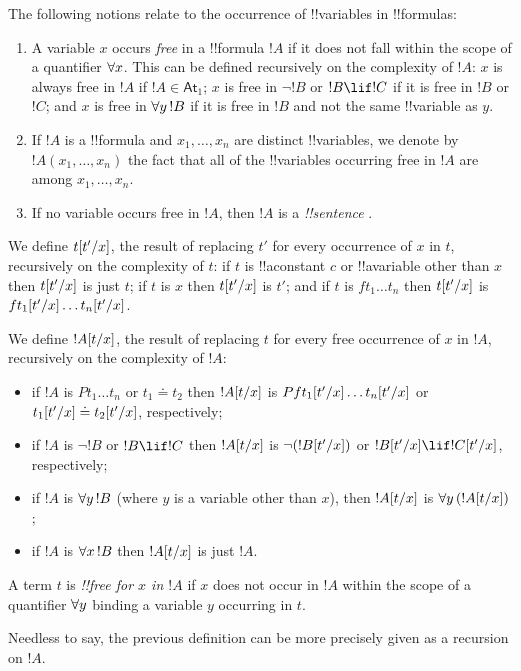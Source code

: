 \documentclass[../../include/open-logic-section]{subfiles}
\begin{document}
\begin{defn}
The following notions relate to the occurrence of
  !!{variable}s in !!{formula}s:
  \begin{enumerate}
  \item A variable $x$ occurs \emph{free} in a !!{formula} $!A$ if it
    does not fall within the scope of a quantifier $\lforall[x]$. This
    can be defined recursively on the complexity of $!A$: $x$ is
    always free in $!A$ if $!A \in \mathsf{At}_1$; $x$ is
    free in $\lnot !B$ or $!B \lif !C$ if it is free in
    $!B$ or $!C$; and $x$ is free in $\lforall[y][!B]$ if it is
    free in $!B$ and not the same !!{variable} as $y$.
  \item If $!A$ is a !!{formula} and $x_1,\ldots,x_n$ are distinct
    !!{variable}s, we denote by $!A(x_1,\ldots,x_n)$ the fact that
    all of the !!{variable}s occurring free in $!A$ are among
    $x_1,\ldots,x_n$.
  \item If no variable occurs free in $!A$, then $!A$ is a
    \emph{!!{sentence}} . 
  \end{enumerate}
\end{defn}

\begin{defn}[Substitution I]
  We define $t[t'/x]$, the result of replacing $t'$ for
  every  occurrence of $x$ in $t$, recursively on the complexity of
  $t$: if $t$ is !!a{constant} $c$ or !!a{variable} other than $x$ then
  $t[t'/x]$ is just $t$; if $t$ is $x$ then $t[t'/x]$
  is $t'$; and if $t$ is $ft_1\ldots t_n$ then $t[t'/x]$ is
  $ft_1[t'/x]\ldots t_n[t'/x]$.
\end{defn}

\begin{defn}[Substitution II]
  We define $!A[t/x]$, the result of replacing $t$ for
  every free occurrence of $x$ in $!A$, recursively on the
  complexity of $!A$:
  \begin{itemize}
  \item if $!A$ is $Pt_1\ldots t_n$ or $t_1 \doteq t_2$ then
    $!A[t/x]$ is $Pf t_1[t'/x]\ldots
t_n[t'/x]$ or $t_1[t'/x] \doteq t_2[t'/x]$,
respectively;
    \item if $!A$ is $\lnot !B$ or $!B \lif !C$ then
      $!A[t/x]$ is  $\lnot(!B[t'/x])$ or
      $\Subst{!B}{t'}{x} \lif \Subst{!C}{t'}{x}$, respectively;
    \item if $!A$ is $\lforall[y][!B]$ (where $y$ is a variable
      other than $x$), then $!A[t/x]$ is $\lforall
      [y][(\Subst{!A}{t}{x})]$;
    \item if $!A$ is $\lforall[x][!B]$ then  $!A[t/x]$
      is just $!A$.
  \end{itemize}
\end{defn}

\begin{defn}
  A term $t$ is \emph{!!{free for} $x$ in $!A$} if $x$ does not occur in
  $!A$ within the scope of a quantifier $\lforall[y]$ binding a
  variable $y$ occurring in $t$.
\end{defn}

\noindent
Needless to say, the previous definition can be more precisely given
as a recursion on $!A$.
\end{document}

